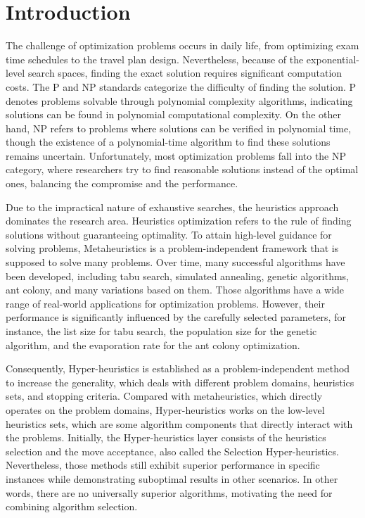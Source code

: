 \documentclass[preprint,review,12pt]{elsarticle}
\begin{document}
\section{Introduction}
\label{sec:intro}
The challenge of optimization problems occurs in daily life, from optimizing exam time schedules to the travel plan design. Nevertheless, because of the exponential-level search spaces, finding the exact solution requires significant computation costs. The P and NP standards categorize the difficulty of finding the solution. P denotes problems solvable through polynomial complexity algorithms, indicating solutions can be found in polynomial computational complexity. On the other hand, NP refers to problems where solutions can be verified in polynomial time, though the existence of a polynomial-time algorithm to find these solutions remains uncertain. Unfortunately, most optimization problems fall into the NP category, where researchers try to find reasonable solutions instead of the optimal ones, balancing the compromise and the performance. 
 
Due to the impractical nature of exhaustive searches, the heuristics approach dominates the research area. Heuristics optimization refers to the rule of finding solutions without guaranteeing optimality. To attain high-level guidance for solving problems, Metaheuristics is a problem-independent framework that is supposed to solve many problems. Over time, many successful algorithms have been developed, including tabu search, simulated annealing, genetic algorithms, ant colony, and many variations based on them. Those algorithms have a wide range of real-world applications for optimization problems. However, their performance is significantly influenced by the carefully selected parameters, for instance, the list size for tabu search, the population size for the genetic algorithm, and the evaporation rate for the ant colony optimization.

Consequently, Hyper-heuristics \cite{misir2021hyper-heuristics} is established as a problem-independent method to increase the generality, which deals with different problem domains, heuristics sets, and stopping criteria. Compared with metaheuristics, which directly operates on the problem domains, Hyper-heuristics works on the low-level heuristics sets, which are some algorithm components that directly interact with the problems. Initially, the Hyper-heuristics layer consists of the heuristics selection and the move acceptance, also called the Selection Hyper-heuristics. Nevertheless, those methods still exhibit superior performance in specific instances while demonstrating suboptimal results in other scenarios. In other words, there are no universally superior algorithms, motivating the need for combining algorithm selection.
\end{document}

